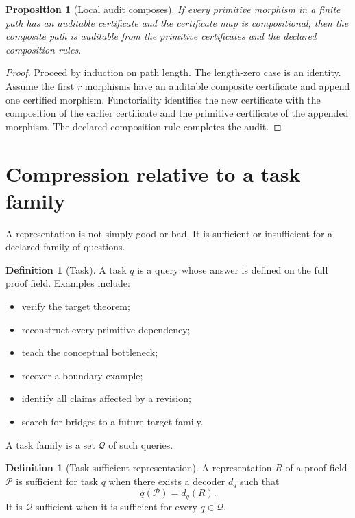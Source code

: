 \documentclass[11pt,oneside]{article}
\newtheorem{proposition}[theorem]{Proposition}
\theoremstyle{definition}
\newtheorem{definition}[theorem]{Definition}
\theoremstyle{remark}
\newcommand{\Pcal}{\mathcal P}
\newcommand{\Qcal}{\mathcal Q}
\begin{document}
\begin{proposition}[Local audit composes]
If every primitive morphism in a finite path has an auditable certificate and the certificate map is compositional, then the composite path is auditable from the primitive certificates and the declared composition rules.
\end{proposition}

\begin{proof}
Proceed by induction on path length. The length-zero case is an identity. Assume the first $r$ morphisms have an auditable composite certificate and append one certified morphism. Functoriality identifies the new certificate with the composition of the earlier certificate and the primitive certificate of the appended morphism. The declared composition rule completes the audit.
\end{proof}

\section{Compression relative to a task family}

A representation is not simply good or bad. It is sufficient or insufficient for a declared family of questions.

\begin{definition}[Task]
A task $q$ is a query whose answer is defined on the full proof field. Examples include:
\begin{itemize}
\item verify the target theorem;
\item reconstruct every primitive dependency;
\item teach the conceptual bottleneck;
\item recover a boundary example;
\item identify all claims affected by a revision;
\item search for bridges to a future target family.
\end{itemize}
A task family is a set $\Qcal$ of such queries.
\end{definition}

\begin{definition}[Task-sufficient representation]
A representation $R$ of a proof field $\Pcal$ is sufficient for task $q$ when there exists a decoder $d_q$ such that
\[
q(\Pcal)=d_q(R).
\]
It is $\Qcal$-sufficient when it is sufficient for every $q\in\Qcal$.
\end{definition}
\end{document}
